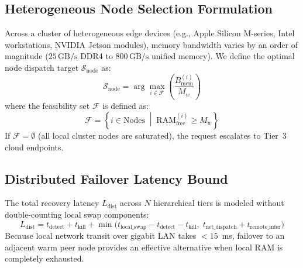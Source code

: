 \documentclass[11pt,a4paper]{article}
\newcommand{\Mw}{M_w}
\newcommand{\GBs}{\,\mathrm{GB/s}}
\begin{document}
\subsection{Heterogeneous Node Selection Formulation}
Across a cluster of heterogeneous edge devices (e.g., Apple Silicon M-series, Intel workstations, NVIDIA Jetson modules), memory bandwidth varies by an order of magnitude ($25\GBs$ DDR4 to $800\GBs$ unified memory). We define the optimal node dispatch target $\mathcal{S}_{\mathrm{node}}$ as:
\begin{equation}\label{eq:node}
\mathcal{S}_{\mathrm{node}} = \arg\max_{i \in \mathcal{F}} \left( \frac{B_{\mathrm{mem}}^{(i)}}{\Mw} \right)
\end{equation}
where the feasibility set $\mathcal{F}$ is defined as:
\begin{equation}\label{eq:feas}
\mathcal{F} = \left\{ i \in \mathrm{Nodes} \;\middle|\; \mathrm{RAM}_{\mathrm{free}}^{(i)} \ge \Mw \right\}
\end{equation}
If $\mathcal{F} = \emptyset$ (all local cluster nodes are saturated), the request escalates to Tier~3 cloud endpoints.

\subsection{Distributed Failover Latency Bound}
The total recovery latency $L_{\mathrm{dist}}$ across $N$ hierarchical tiers is modeled without double-counting local swap components:
\begin{equation}\label{eq:ldist}
L_{\mathrm{dist}} = t_{\mathrm{detect}} + t_{\mathrm{kill}} + \min\!\bigl( t_{\mathrm{local\_swap}} - t_{\mathrm{detect}} - t_{\mathrm{kill}},\; t_{\mathrm{net\_dispatch}} + t_{\mathrm{remote\_infer}} \bigr)
\end{equation}
Because local network transit over gigabit LAN takes $< 15$~ms, failover to an adjacent warm peer node provides an effective alternative when local RAM is completely exhausted.

\end{document}
